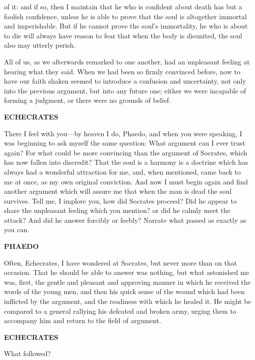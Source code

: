 \documentclass[11pt,letter]{article}
\begin{document}
of it: and if so, then I maintain that he who is confident about death has but a foolish confidence, unless he is able to prove that the soul is altogether immortal and imperishable. But if he cannot prove the soul's immortality, he who is about to die will always have reason to fear that when the body is disunited, the soul also may utterly perish.

\par  All of us, as we afterwards remarked to one another, had an unpleasant feeling at hearing what they said. When we had been so firmly convinced before, now to have our faith shaken seemed to introduce a confusion and uncertainty, not only into the previous argument, but into any future one; either we were incapable of forming a judgment, or there were no grounds of belief.

\par \textbf{ECHECRATES}
\par   There I feel with you—by heaven I do, Phaedo, and when you were speaking, I was beginning to ask myself the same question:  What argument can I ever trust again? For what could be more convincing than the argument of Socrates, which has now fallen into discredit? That the soul is a harmony is a doctrine which has always had a wonderful attraction for me, and, when mentioned, came back to me at once, as my own original conviction. And now I must begin again and find another argument which will assure me that when the man is dead the soul survives. Tell me, I implore you, how did Socrates proceed? Did he appear to share the unpleasant feeling which you mention? or did he calmly meet the attack? And did he answer forcibly or feebly? Narrate what passed as exactly as you can.

\par \textbf{PHAEDO}
\par   Often, Echecrates, I have wondered at Socrates, but never more than on that occasion. That he should be able to answer was nothing, but what astonished me was, first, the gentle and pleasant and approving manner in which he received the words of the young men, and then his quick sense of the wound which had been inflicted by the argument, and the readiness with which he healed it. He might be compared to a general rallying his defeated and broken army, urging them to accompany him and return to the field of argument.

\par \textbf{ECHECRATES}
\par   What followed?
\end{document}
